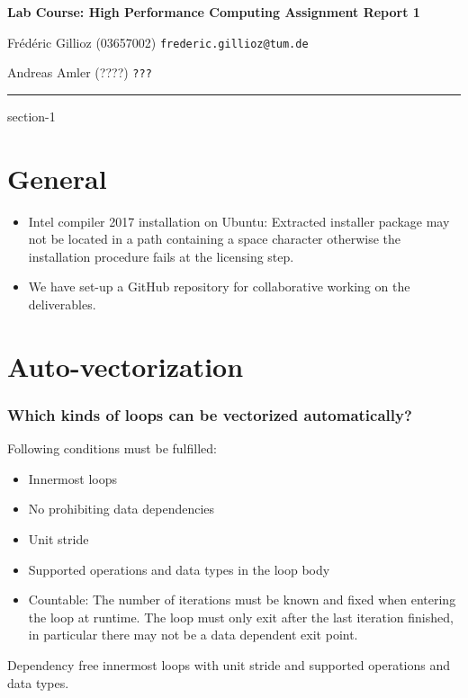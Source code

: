 \documentclass[11pt]{article}
\makeatletter
\newcommand{\hwhead}[4]{
\begin{center}
\sffamily\large\bfseries Lab Course: High Performance Computing Assignment Report #1
\vspace{2mm} 
\normalfont

#2

#3
\end{center}
\vspace{6mm} \hrule \vspace{4mm}
}
\newcommand{\namea}{Frédéric Gillioz (03657002) \texttt{frederic.gillioz@tum.de}}
\newcommand{\nameb}{Andreas Amler (????) \texttt{???}}
\makeatother
\begin{document}
\hwhead{1}{\namea}{\nameb}


\setcounter{section}{-1}
\section{General}

\begin{itemize}
\item Intel compiler 2017 installation on Ubuntu: Extracted installer package may not be located in a path containing a space character otherwise the installation procedure fails at the licensing step.
\item We have set-up a GitHub repository for collaborative working on the deliverables.
\end{itemize}

\section{Auto-vectorization}

\subsubsection*{Which kinds of loops can be vectorized automatically?}
Following conditions must be fulfilled:
\begin{itemize}
\item Innermost loops
\item No prohibiting data dependencies
\item Unit stride
\item Supported operations and data types in the loop body
\item Countable: The number of iterations must be known and fixed when entering the loop at runtime. The loop must only exit after the last iteration finished, in particular there may not be a data dependent exit point.
\end{itemize}

Dependency free innermost loops with unit stride and supported operations and data types.
\end{document}
